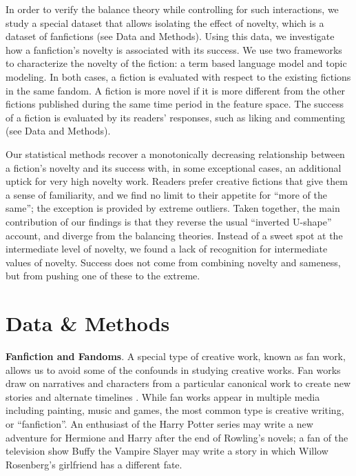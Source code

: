 \documentclass[letterpaper]{article} %
\begin{document}
In order to verify the balance theory while controlling for such interactions, we study a special dataset that allows isolating the effect of novelty, which is a dataset of fanfictions (see Data and Methods). Using this data, we investigate how a fanfiction's novelty is associated with its success. We use two frameworks to characterize the novelty of the fiction: a term based language model and topic modeling. In both cases, a fiction is evaluated with respect to the existing fictions in the same fandom. A fiction is more novel if it is more different from the other fictions published during the same time period in the feature space. The success of a fiction is evaluated by its readers’ responses, such as liking and commenting (see Data and Methods). 


Our statistical methods recover a monotonically decreasing relationship between a fiction's novelty and its success with, in some exceptional cases, an additional uptick for very high novelty work. Readers prefer creative fictions that give them a sense of familiarity, and we find no limit to their appetite for ``more of the same''; the exception is provided by extreme outliers. Taken together, the main contribution of our findings is that they reverse the usual ``inverted  U-shape'' account, and diverge from the balancing theories. Instead of a sweet spot at the intermediate level of novelty, we found a lack of recognition for intermediate values of novelty. Success does not come from combining novelty and sameness, but from pushing one of these to the extreme.


\section*{Data \& Methods}

 
\textbf{Fanfiction and Fandoms}. A special type of creative work, known as fan work, allows us to avoid some of the confounds in studying creative works. Fan works draw on narratives and characters from a particular canonical work to create new stories and alternate timelines \cite{wiki:transf_work}. While fan works appear in multiple media including painting, music and games, the most common type is creative writing, or ``fanfiction''. An enthusiast of the Harry Potter series may write a new adventure for Hermione and Harry after the end of Rowling's novels; a fan of the television show Buffy the Vampire Slayer may write a story in which Willow Rosenberg's girlfriend has a different fate. 
\end{document}
